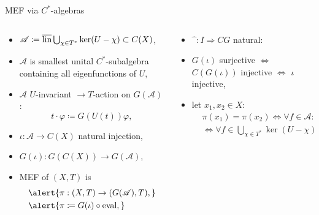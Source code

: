 \begin{frame}[fragile]{MEF via $C^*$-algebras}
  \begin{columns}[t]
    \begin{column}{0.5\textwidth}
     \begin{itemize}
       \item $\mathscr{A}\coloneq \overline{\operatorname{lin}} \bigcup_{\chi \in T^*} \ker (U- \chi) \subset C(X)$,
    \item  $\mathscr{A}$ is smallest unital $C^*$-subalgebra containing all eigenfunctions of $U$,
   \item \pause
      $\mathscr{A}$ $U$-invariant $\rightarrow T$-action on $G(\mathscr{A})$:
      \begin{equation*}
      t\cdot \varphi \coloneq G(U(t))\varphi,
      \end{equation*}
    \item \pause $\iota : \mathscr{A} \to C(X)$ natural injection,
    \item $G(\iota)  : G(C(X)) \to G(\mathscr{A})$,
    \item \alert{MEF of $(X,T)$ is}
      \begin{equation*}
        \begin{split}
          &\alert{\pi : (X,T) \to (G(\mathscr{A}),T),}\\ 
          &\alert{\pi \coloneq G(\iota) \circ \ev,}
        \end{split}
      \end{equation*}
        \end{itemize}
    \end{column}
    \begin{column}{0.48 \textwidth}
 \begin{itemize}
 \item \pause $\widehat{\phantom{a}}: I \Rightarrow CG$ natural:
   \item \pause
          $G(\iota)$ surjective $\Leftrightarrow$ $C (G( \iota ))$ injective $\Leftrightarrow$ $\iota$ injective,
    \item \pause let $x_1, x_2 \in X$:
      \begin{equation*}
        \begin{split}
          &\pi (x_1) = \pi (x_2) \Leftrightarrow \forall f \in \mathscr{A} : f(x_1) = f(x_2) \\
          &\Leftrightarrow \forall f \in \bigcup_{\chi \in T^*} \ker (U- \chi)  : f(x_1) = f(x_2).
        \end{split}
    \end{equation*}
        \end{itemize}
    \end{column}
  \end{columns}
  \end{frame}
